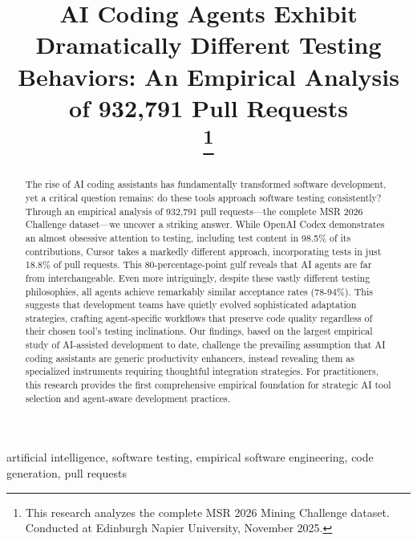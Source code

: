 \documentclass[conference]{IEEEtran}
\begin{document}
\title{AI Coding Agents Exhibit Dramatically Different Testing Behaviors: An Empirical Analysis of 932,791 Pull Requests\\
\thanks{This research analyzes the complete MSR 2026 Mining Challenge dataset. Conducted at Edinburgh Napier University, November 2025.}
}

\author{
}

\maketitle

\begin{abstract}
The rise of AI coding assistants has fundamentally transformed software development, yet a critical question remains: do these tools approach software testing consistently? Through an empirical analysis of 932,791 pull requests—the complete MSR 2026 Challenge dataset—we uncover a striking answer. While OpenAI Codex demonstrates an almost obsessive attention to testing, including test content in 98.5\% of its contributions, Cursor takes a markedly different approach, incorporating tests in just 18.8\% of pull requests. This 80-percentage-point gulf reveals that AI agents are far from interchangeable. Even more intriguingly, despite these vastly different testing philosophies, all agents achieve remarkably similar acceptance rates (78-94\%). This suggests that development teams have quietly evolved sophisticated adaptation strategies, crafting agent-specific workflows that preserve code quality regardless of their chosen tool's testing inclinations. Our findings, based on the largest empirical study of AI-assisted development to date, challenge the prevailing assumption that AI coding assistants are generic productivity enhancers, instead revealing them as specialized instruments requiring thoughtful integration strategies. For practitioners, this research provides the first comprehensive empirical foundation for strategic AI tool selection and agent-aware development practices.
\end{abstract}
\begin{IEEEkeywords}
artificial intelligence, software testing, empirical software engineering, code generation, pull requests
\end{IEEEkeywords}
\end{document}
